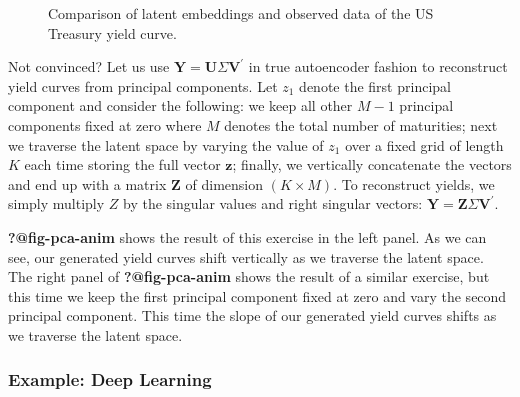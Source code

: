 \documentclass[
  letterpaper,
  DIV=11,
  numbers=noendperiod]{scrartcl}
\theoremstyle{plain}
\theoremstyle{remark}
\begin{document}
\begin{figure}


\caption{\label{fig-pca}Comparison of latent embeddings and observed
data of the US Treasury yield curve.}

\end{figure}%

Not convinced? Let us use
\(\mathbf{Y}=\mathbf{U}\Sigma\mathbf{V}^{\prime}\) in true autoencoder
fashion to reconstruct yield curves from principal components. Let
\(z_1\) denote the first principal component and consider the following:
we keep all other \(M-1\) principal components fixed at zero where \(M\)
denotes the total number of maturities; next we traverse the latent
space by varying the value of \(z_1\) over a fixed grid of length \(K\)
each time storing the full vector \(\mathbf{z}\); finally, we vertically
concatenate the vectors and end up with a matrix \(\mathbf{Z}\) of
dimension \((K \times M)\). To reconstruct yields, we simply multiply
\(Z\) by the singular values and right singular vectors:
\(\mathbf{Y}=\mathbf{Z}\Sigma\mathbf{V}^{\prime}\).

\textbf{?@fig-pca-anim} shows the result of this exercise in the left
panel. As we can see, our generated yield curves shift vertically as we
traverse the latent space. The right panel of \textbf{?@fig-pca-anim}
shows the result of a similar exercise, but this time we keep the first
principal component fixed at zero and vary the second principal
component. This time the slope of our generated yield curves shifts as
we traverse the latent space.

\subsubsection{Example: Deep Learning}\label{example-deep-learning}
\end{document}
